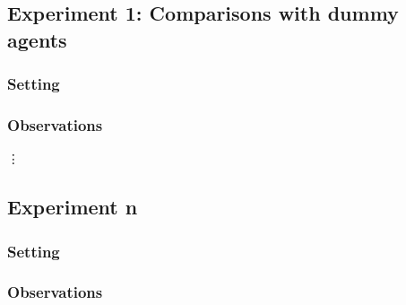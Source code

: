 \documentclass[11pt]{article}
\begin{document}
\subsection{Experiment 1: Comparisons with dummy agents} 
 

\subsubsection{Setting}



\subsubsection{Observations} 


\vdots

\subsection{Experiment n} 

\subsubsection{Setting}

\subsubsection{Observations}
\end{document}

